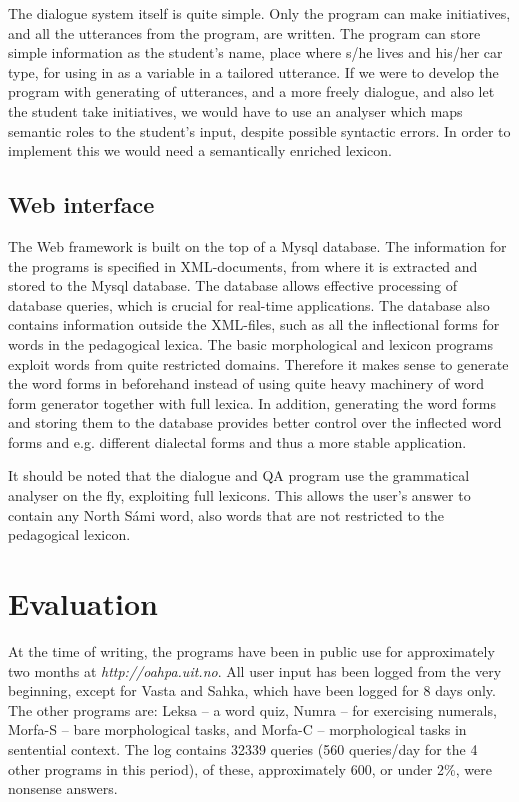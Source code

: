 \documentclass[11pt]{article}
\begin{document}
The dialogue system itself is quite simple. Only
the program can make initiatives, and all the utterances from the program, are written. The program can store simple information as the student's name, place where s/he lives and his/her car type, for using in as a variable in a tailored utterance. If we were to develop the program with generating of utterances, and a more freely dialogue, and also let the student take initiatives, we would have to use an analyser which maps semantic roles to the student's input, despite possible syntactic errors. In order to implement this we would need a semantically enriched lexicon.



\subsection{Web interface}

The Web framework is built on the top of a Mysql database. The information for the programs is specified in XML-documents, from where it is extracted and stored to the Mysql database. The database allows effective processing of database queries, which is crucial for real-time applications. The database also contains information outside the XML-files, such as all the inflectional forms for words in the pedagogical lexica. The basic morphological and lexicon programs exploit words from quite restricted domains. Therefore it makes sense to generate the word forms in beforehand instead of using quite heavy machinery of word form generator together with full lexica. In addition, generating the word forms and storing them to the database provides better control over the inflected word forms and e.g. different dialectal forms and thus a more stable application.

It should be noted that 
the dialogue and QA program
 use the grammatical analyser on the fly, exploiting full lexicons. This allows the user's answer to contain any North Sámi word, also words that are not restricted to the pedagogical lexicon.

\section{Evaluation}

At the time of writing, the programs have been in public use for approximately two months at \textit{http://oahpa.uit.no}. All user input has been logged from the very beginning, except for Vasta and Sahka, which have been logged for 8 days only. The other programs are: Leksa -- a word quiz, Numra -- for exercising numerals, Morfa-S -- bare morphological tasks, and Morfa-C -- morphological tasks in sentential context. The log contains 32339 queries (560 queries/day for the 4 other programs in this period), of these, approximately 600, or under 2\%, were nonsense answers.
\end{document}
